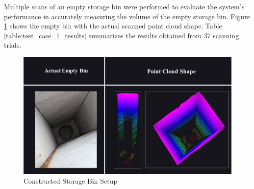 Multiple scans of an empty storage bin were performed to evaluate the system's performance in accurately measuring the volume of the empty storage bin. Figure \ref{ch4:fig:empty-bin-point-cloud} shows the empty bin with the actual scanned point cloud shape. Table \ref{table:test_case_1_results} summarizes the results obtained from 37 scanning trials.

\begin{figure}[H]
	\centering
	\includegraphics[width=1\textwidth]{Figures/empty-bin-point-cloud}
	\caption{Constructed Storage Bin Setup}
	\label{ch4:fig:empty-bin-point-cloud}
\end{figure}

